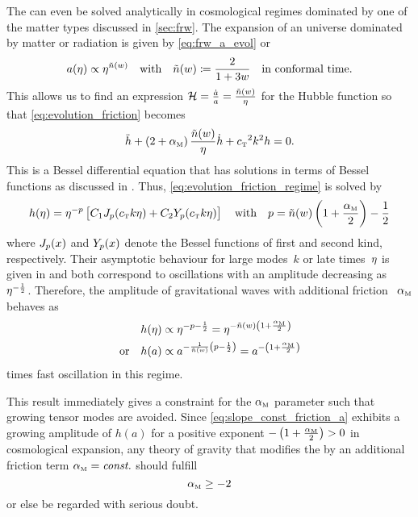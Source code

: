 \documentclass[12pt,parskip=half]{scrreprt}
\begin{document}
The  can even be solved analytically in cosmological regimes dominated by one of the matter types discussed in \autoref{sec:frw}. The expansion of an \FLRW universe dominated by matter or radiation is given by \eqref{eq:frw_a_evol} or
\begin{equation}
	a(\eta) \propto \eta^{\tilde{n}(w)} \quad \text{with} \quad \tilde{n}(w) \coloneqq \frac{2}{1+3w} \quad \text{in conformal time.}
\end{equation}
This allows us to find an expression \(\mathcal{H} = \frac{\dot{a}}{a} = \frac{\tilde{n}(w)}{\eta}\) for the Hubble function so that \eqref{eq:evolution_friction} becomes
\begin{equation}\label{eq:evolution_friction_regime}
	\ddconf{h} + \del{2 + \alphaM} \frac{\nexpconft}{\conft} \dconf{h} + \cT^2 k^2 h = 0
	\eqpunct{.}
\end{equation}
This is a Bessel differential equation that has solutions in terms of Bessel functions as discussed in . Thus, \eqref{eq:evolution_friction_regime} is solved by
\begin{equation}
	h(\conft) = \conft^{-p} \sbr{C_1 \besselJ_p(\cT k \conft) + C_2 \besselY_p(\cT k \conft)} \quad \text{with} \quad p = \nexpconft\del{1 + \frac{\alphaM}{2}}-\frac{1}{2}
\end{equation}
where \(J_p(x)\) and \(Y_p(x)\) denote the Bessel functions of first and second kind, respectively. Their asymptotic behaviour for large modes~\(k\) or late times~\(\eta\) is given in  and both correspond to oscillations with an amplitude decreasing as~\(\eta^{-\frac{1}{2}}\). Therefore, the amplitude of gravitational waves with additional friction ~\({\alpha_{\textnormal{\tiny{M}}}}\) behaves as
\begin{subequations}\label{eq:slope_const_friction}
\begin{align}
	h(\conft) &\propto \conft^{-p-\frac{1}{2}} = \conft^{-\nexpconft\del{1+\frac{\alphaM}{2}}} \\
	\text{or} \quad h(a) &\propto a^{-\frac{1}{\nexpconft}\del{p-\frac{1}{2}}} = a^{-\del{1+\frac{\alphaM}{2}}} \label{eq:slope_const_friction_a}
\end{align}
\end{subequations}
times fast oscillation in this regime.

This result immediately gives a constraint for the \({\alpha_{\textnormal{\tiny{M}}}}\) parameter such that growing tensor modes are avoided. Since \eqref{eq:slope_const_friction_a} exhibits a growing amplitude of \(h(a)\) for a positive exponent \(-\del{1+\frac{\alphaM}{2}} > 0\) in cosmological expansion, any theory of gravity that modifies the  by an additional friction term \({\alpha_{\textnormal{\tiny{M}}}}=\textnormal{\textit{const.}}\) should fulfill
\begin{equation}\label{eq:grow_cond_const_fric}
	{\alpha_{\textnormal{\tiny{M}}}} \geq -2
\end{equation}
or else be regarded with serious doubt. 
\end{document}
